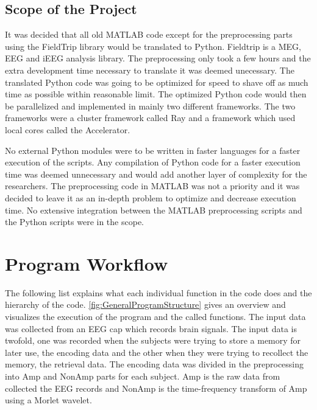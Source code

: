 \documentclass[12pt, a4paper]{article}
\begin{document}
\subsection{Scope of the Project}%

It was decided that all old MATLAB code except for the preprocessing parts using the FieldTrip library would be translated to Python.
Fieldtrip is a MEG, EEG and iEEG analysis library\cite{Oostenveld2010}.
The preprocessing only took a few hours and the extra development time necessary to translate it was deemed unecessary. 
The translated Python code was going to be optimized for speed to shave off as much time as possible within reasonable limit.
The optimized Python code would then be parallelized and implemented in mainly two different frameworks.
The two frameworks were a cluster framework called Ray and a framework which used local cores called the Accelerator.

No external Python modules were to be written in faster languages for a faster execution of the scripts.
Any compilation of Python code for a faster execution time was deemed unnecessary and would add another layer of complexity for the researchers.
The preprocessing code in MATLAB was not a priority and it was decided to leave it as an in-depth problem to optimize and decrease execution time.
No extensive integration between the MATLAB preprocessing scripts and the Python scripts were in the scope.


\section{Program Workflow}

The following list explains what each individual function in the code does and the hierarchy of the code.
\cref{fig:GeneralProgramStructure} gives an overview and visualizes the execution of the program and the called functions.
The input data was collected from an EEG cap which records brain signals.
The input data is twofold, one was recorded when the subjects were trying to store a memory for later use, the encoding data and the other when they were trying to recollect the memory, the retrieval data.
The encoding data was divided in the preprocessing into Amp and NonAmp parts for each subject. 
Amp is the raw data from collected the EEG records and NonAmp is the time-frequency transform of Amp using a Morlet wavelet.%
\end{document}
